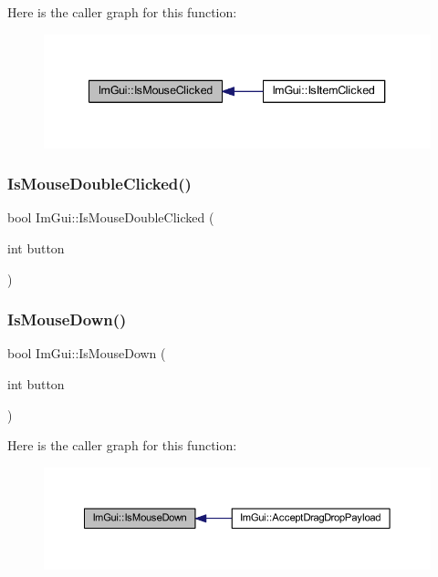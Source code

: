 Here is the caller graph for this function\+:
\nopagebreak
\begin{figure}[H]
\begin{center}
\leavevmode
\includegraphics[width=340pt]{namespace_im_gui_a22b689cf4cf519590c2e2ad4f5462f29_icgraph}
\end{center}
\end{figure}
\mbox{\label{namespace_im_gui_a0d39701e7a0d7629e1b96b68e935542e}} 
\subsubsection{\texorpdfstring{Is\+Mouse\+Double\+Clicked()}{IsMouseDoubleClicked()}}
{\footnotesize\ttfamily bool Im\+Gui\+::\+Is\+Mouse\+Double\+Clicked (\begin{DoxyParamCaption}\item[{int}]{button }\end{DoxyParamCaption})}

\mbox{\label{namespace_im_gui_a8ddf4d05de8ab8b9aa70906a22a9973e}} 
\subsubsection{\texorpdfstring{Is\+Mouse\+Down()}{IsMouseDown()}}
{\footnotesize\ttfamily bool Im\+Gui\+::\+Is\+Mouse\+Down (\begin{DoxyParamCaption}\item[{int}]{button }\end{DoxyParamCaption})}

Here is the caller graph for this function\+:
\nopagebreak
\begin{figure}[H]
\begin{center}
\leavevmode
\includegraphics[width=350pt]{namespace_im_gui_a8ddf4d05de8ab8b9aa70906a22a9973e_icgraph}
\end{center}
\end{figure}
\mbox{\label{namespace_im_gui_a7905828a024c6c005fa1887e62235ca4}} 
